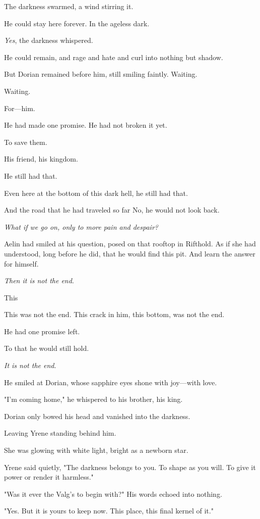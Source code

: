 The darkness swarmed, a wind stirring it.

He could stay here forever. In the ageless dark.

\emph{Yes}, the darkness whispered.

He could remain, and rage and hate and curl into nothing but shadow.

But Dorian remained before him, still smiling faintly. Waiting.

Waiting.

For---him.

He had made one promise. He had not broken it yet.

To save them.

His friend, his kingdom.

He still had that.

Even here at the bottom of this dark hell, he still had that.

And the road that he had traveled so far  No, he would not look back.

\emph{What if we go on, only to more pain and despair?}

Aelin had smiled at his question, posed on that rooftop in Rifthold. As if she had understood, long before he did, that he would find this pit. And learn the answer for himself.

\emph{Then it is not the end}.

This 

This was not the end. This crack in him, this bottom, was not the end.

He had one promise left.

To that he would still hold.

\emph{It is not the end}.

He smiled at Dorian, whose sapphire eyes shone with joy---with love.

"I'm coming home," he whispered to his brother, his king.

Dorian only bowed his head and vanished into the darkness.

Leaving Yrene standing behind him.

She was glowing with white light, bright as a newborn star.

Yrene said quietly, "The darkness belongs to you. To shape as you will. To give it power or render it harmless."

"Was it ever the Valg's to begin with?" His words echoed into nothing.

"Yes. But it is yours to keep now. This place, this final kernel of it."

